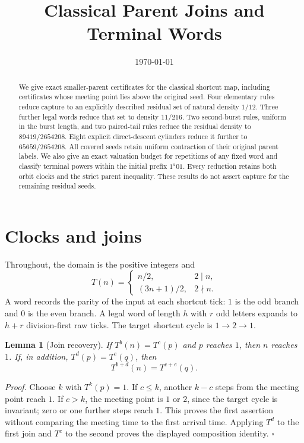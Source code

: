 \documentclass[11pt,letterpaper]{article}
\title{Classical Parent Joins and Terminal Words}
\author{}
\date{\today}
\newtheorem{lemma}[theorem]{Lemma}
\newenvironment{proof}{\noindent\textit{Proof.}}{\hfill\(\square\)}
\begin{document}
\maketitle

\begin{abstract}
We give exact smaller-parent certificates for the classical shortcut map,
including certificates whose meeting point lies above the original seed.
Four elementary rules reduce capture to an explicitly described residual
set of natural density \(1/12\). Three further legal words reduce that set
to density \(11/216\). Two second-burst rules, uniform in the burst length, and two paired-tail
rules reduce the residual density to \(89419/2654208\). Eight explicit
direct-descent cylinders reduce it further to \(65659/2654208\). All
covered seeds retain uniform contraction of their original parent labels.
We also give an exact valuation budget for repetitions of any fixed word
and classify terminal powers within the initial prefix \(1^a01\).
Every reduction retains both orbit clocks and the strict parent inequality.
These results do not assert capture for the remaining residual seeds.
\end{abstract}

\section{Clocks and joins}

Throughout, the domain is the positive integers and
\[
T(n)=\begin{cases}n/2,&2\mid n,\\(3n+1)/2,&2\nmid n.\end{cases}
\]
A word records the parity of the input at each shortcut tick: \(1\) is the
odd branch and \(0\) is the even branch. A legal word of length \(h\) with
\(r\) odd letters expands to \(h+r\) division-first raw ticks.
The target shortcut cycle is \(1\to2\to1\).

\begin{lemma}[Join recovery]
If \(T^b(n)=T^c(p)\) and \(p\) reaches \(1\), then \(n\) reaches \(1\).
If, in addition, \(T^d(p)=T^e(q)\), then
\[
T^{b+d}(n)=T^{c+e}(q).
\]
\end{lemma}
\begin{proof}
Choose \(k\) with \(T^k(p)=1\). If \(c\le k\), another \(k-c\) steps from
the meeting point reach \(1\). If \(c>k\), the meeting point is \(1\) or
\(2\), since the target cycle is invariant; zero or one further steps
reach \(1\). This proves the first assertion without comparing the
meeting time to the first arrival time. Applying \(T^d\) to the first
join and \(T^c\) to the second proves the displayed composition identity.
\end{proof}
\end{document}
